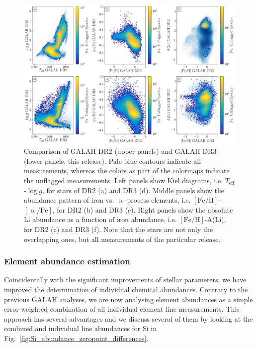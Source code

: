\documentclass[fleqn,usenatbib,useAMS]{mnras}
\newcommand{\teff}{$T_\mathrm{eff}$\xspace}
\newcommand{\logg}{$\log g$\xspace}
\newcommand{\feh}{$\mathrm{[Fe/H]}$\xspace}
\newcommand{\alphafe}{$\mathrm{[\upalpha/Fe]}$\xspace}
\begin{document}
\begin{figure}
\centering
\includegraphics[width=\textwidth]{figures/galah_dr3_comparison_dr2.pdf}
\caption{Comparison of GALAH DR2 (upper panels) and GALAH DR3 (lower panels, this release). Pale blue contours indicate all measurements, whereas the colors as part of the colormaps indicate the unflagged measurements. Left panels show Kiel diagrams, i.e. \teff-\logg, for stars of DR2 (a) and DR3 (d). Middle panels show the abundance pattern of iron vs. $\upalpha$-process elements, i.e. \feh-\alphafe, for DR2 (b) and DR3 (e). Right panels show the absolute Li abundance as a function of iron abundance, i.e. \feh-A(Li), for DR2 (c) and DR3 (f). Note that the stars are not only the overlapping ones, but all measurements of the particular release.}
\label{fig:galah_dr3_comparison_dr2}
\end{figure}

\subsubsection{Element abundance estimation}

Coincidentally with the significant improvements of stellar parameters, we have improved the determination of individual chemical abundances. Contrary to the previous GALAH analyses, we are now analysing element abundances as a simple error-weighted combination of all individual element line measurements. This approach has several advantages and we discuss several of them by looking at the combined and individual line abundances for Si in Fig.~\ref{fig:Si_abundance_zeropoint_differences}.
\end{document}
